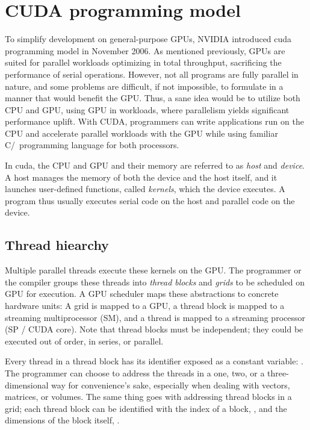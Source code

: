 \section{CUDA programming model} \label{label:cuda}

To simplify development on general-purpose GPUs, NVIDIA introduced \acrfull{cuda} programming model in November 2006. As mentioned previously, GPUs are suited for parallel workloads optimizing in total throughput, sacrificing the performance of serial operations. However, not all programs are fully parallel in nature, and some problems are difficult, if not impossible, to formulate in a manner that would benefit the GPU. Thus, a sane idea would be to utilize both CPU and GPU, using GPU in workloads, where parallelism yields significant performance uplift. With CUDA, programmers can write applications run on the CPU and accelerate parallel workloads with the GPU while using familiar C/\CC\ programming language for both processors.

In \acrshort{cuda}, the CPU and GPU and their memory are referred to as \textit{host} and \textit{device}. A host manages the memory of both the device and the host itself, and it launches user-defined functions, called \textit{kernels}, which the device executes. A program thus usually executes serial code on the host and parallel code on the device.

\subsection{Thread hiearchy}

Multiple parallel threads execute these kernels on the GPU. The programmer or the compiler groups these threads into \textit{thread blocks} and \textit{grids} to be scheduled on GPU for execution. A GPU scheduler maps these abstractions to concrete hardware units: A grid is mapped to a GPU, a thread block is mapped to a streaming multiprocessor (SM), and a thread is mapped to a streaming processor (SP / CUDA core). Note that thread blocks must be independent; they could be executed out of order, in series, or parallel.

Every thread in a thread block has its identifier exposed as a constant variable: . The programmer can choose to address the threads in a one, two, or a three-dimensional way for convenience's sake, especially when dealing with vectors, matrices, or volumes. The same thing goes with addressing thread blocks in a grid; each thread block can be identified with the index of a block, , and the dimensions of the block itself, .

